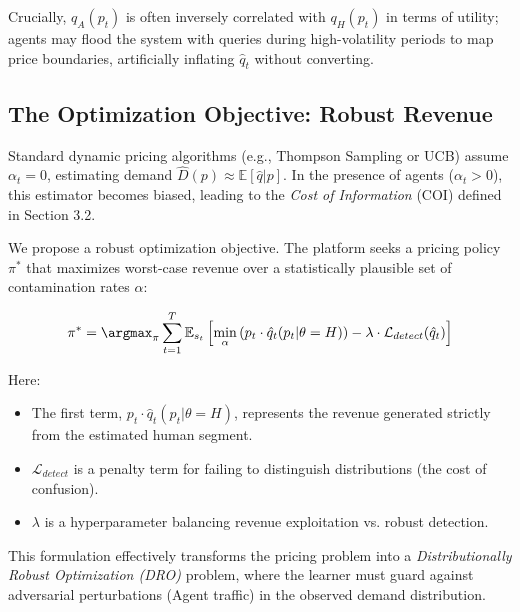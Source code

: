 Crucially, $q_A(p_t)$ is often inversely correlated with $q_H(p_t)$ in terms of utility; agents may flood the system with queries during high-volatility periods to map price boundaries, artificially inflating $\hat{q}_t$ without converting.

\subsection{The Optimization Objective: Robust Revenue}

Standard dynamic pricing algorithms (e.g., Thompson Sampling or UCB) assume $\alpha_t = 0$, estimating demand $\hat{D}(p) \approx \mathbb{E}[\hat{q} | p]$. In the presence of agents ($\alpha_t > 0$), this estimator becomes biased, leading to the \textit{Cost of Information} (COI) defined in Section 3.2.

We propose a robust optimization objective. The platform seeks a pricing policy $\pi^*$ that maximizes worst-case revenue over a statistically plausible set of contamination rates $\alpha$:

\begin{equation}
    \pi^* = \argmax_{\pi} \sum_{t=1}^T \mathbb{E}_{s_t} \left[ \min_{\alpha} \left( p_t \cdot \hat{q}_t(p_t | \theta=H) \right) - \lambda \cdot \mathcal{L}_{detect}(\hat{q}_t) \right]
\end{equation}

Here:
\begin{itemize}
    \item The first term, $p_t \cdot \hat{q}_t(p_t | \theta=H)$, represents the revenue generated strictly from the estimated human segment.
    \item $\mathcal{L}_{detect}$ is a penalty term for failing to distinguish distributions (the cost of confusion).
    \item $\lambda$ is a hyperparameter balancing revenue exploitation vs. robust detection.
\end{itemize}

This formulation effectively transforms the pricing problem into a \textit{Distributionally Robust Optimization (DRO)} problem, where the learner must guard against adversarial perturbations (Agent traffic) in the observed demand distribution.
